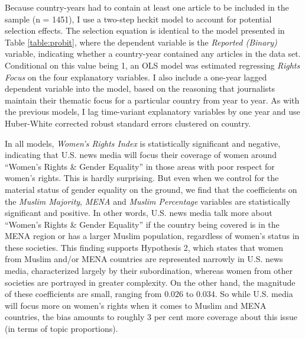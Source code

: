 \documentclass[11pt, oneside]{article}
\begin{document}
Because country-years had to contain at least one article to be included in the sample (n = 1451), I use a two-step heckit model to account for potential selection effects. The selection equation is identical to the model presented in Table \ref{table:probit}, where the dependent variable is the \emph{Reported (Binary)} variable, indicating whether a country-year contained any articles in the data set. Conditional on this value being 1, an OLS model was estimated regressing \emph{Rights Focus} on the four explanatory variables. I also include a one-year lagged dependent variable into the model, based on the reasoning that journalists maintain their thematic focus for a particular country from year to year. As with the previous models, I lag time-variant explanatory variables by one year and use Huber-White corrected robust standard errors clustered on country.

In all models, \emph{Women's Rights Index} is statistically significant and negative, indicating that U.S. news media will focus their coverage of women around ``Women's Rights \& Gender Equality'' in those areas with poor respect for women's rights. This is hardly surprising. But even when we control for the material status of gender equality on the ground, we find that the coefficients on the \emph{Muslim Majority}, \emph{MENA} and \emph{Muslim Percentage} variables are statistically significant and positive. In other words, U.S. news media talk more about ``Women's Rights \& Gender Equality'' if the country being covered is in the MENA region or has a larger Muslim population, regardless of women's status in these societies. This finding supports Hypothesis 2, which states that women from Muslim and/or MENA countries are represented narrowly in U.S. news media, characterized largely by their subordination, whereas women from other societies are portrayed in greater complexity. On the other hand, the magnitude of these coefficients are small, ranging from $0.026$ to $0.034$. So while U.S. media will focus more on women's rights when it comes to Muslim and MENA countries, the bias amounts to roughly 3 per cent more coverage about this issue (in terms of topic proportions).


\end{document}
